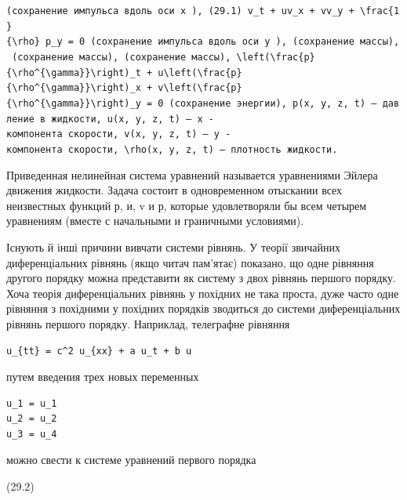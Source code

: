 \documentclass[
  ukrainian,
]{article}
\begin{document}
\texttt{(сохранение\ импульса\ вдоль\ оси\ \textquotesingle{}x\textquotesingle{}\ ),\ (29.1)\ \textquotesingle{}v\_t\ +\ uv\_x\ +\ vv\_y\ +\ \textbackslash{}frac\{1\}\{\textbackslash{}rho\}\ p\_y\ =\ 0\textquotesingle{}\ (сохранение\ импульса\ вдоль\ оси\ \textquotesingle{}y\textquotesingle{}\ ),\ (сохранение\ массы),\ (сохранение\ массы),\ (сохранение\ массы),\ \textquotesingle{}\textbackslash{}left(\textbackslash{}frac\{p\}\{\textbackslash{}rho\^{}\{\textbackslash{}gamma\}\}\textbackslash{}right)\_t\ +\ u\textbackslash{}left(\textbackslash{}frac\{p\}\{\textbackslash{}rho\^{}\{\textbackslash{}gamma\}\}\textbackslash{}right)\_x\ +\ v\textbackslash{}left(\textbackslash{}frac\{p\}\{\textbackslash{}rho\^{}\{\textbackslash{}gamma\}\}\textbackslash{}right)\_y\ =\ 0\textquotesingle{}\ (сохранение\ энергии),\ \textquotesingle{}p(x,\ y,\ z,\ t)\textquotesingle{}\ —\ давление\ в\ жидкости,\ \textquotesingle{}u(x,\ y,\ z,\ t)\textquotesingle{}\ —\ \textquotesingle{}x\textquotesingle{}\ -компонента\ скорости,\ \textquotesingle{}v(x,\ y,\ z,\ t)\textquotesingle{}\ —\ \textquotesingle{}y\textquotesingle{}\ -компонента\ скорости,\ \textquotesingle{}\textbackslash{}rho(x,\ y,\ z,\ t)\textquotesingle{}\ —\ плотность\ жидкости.}

Приведенная нелинейная система уравнений называется уравнениями Эйлера
движения жидкости. Задача состоит в одновременном отыскании всех
неизвестных функций р, и, v и р, которые удовлетворяли бы всем четырем
уравнениям (вместе с начальными и граничными условиями).

Існують й інші причини вивчати системи рівнянь. У теорії звичайних
диференціальних рівнянь (якщо читач пам'ятає) показано, що одне рівняння
другого порядку можна представити як систему з двох рівнянь першого
порядку. Хоча теорія диференціальних рівнянь у похідних не така проста,
дуже часто одне рівняння з похідними у похідних порядків зводиться до
системи диференціальних рівнянь першого порядку. Наприклад, телеграфне
рівняння

\begin{verbatim}
u_{tt} = c^2 u_{xx} + a u_t + b u
\end{verbatim}

путем введения трех новых переменных

\begin{verbatim}
u_1 = u_1
u_2 = u_2
u_3 = u_4
\end{verbatim}

можно свести к системе уравнений первого порядка

(29.2)
\end{document}
